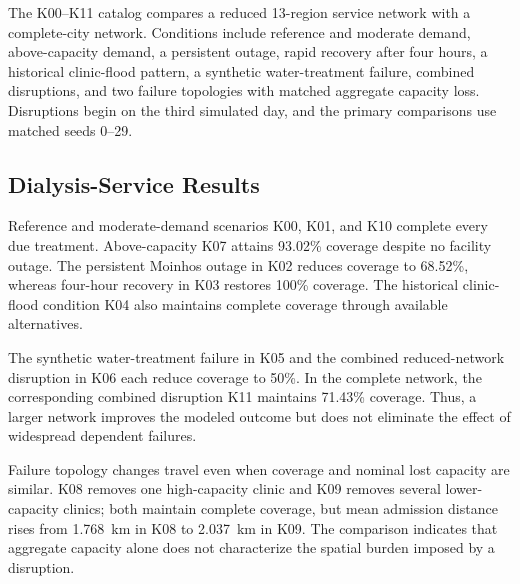 \documentclass[pdflatex,sn-mathphys-num]{sn-jnl}%
\theoremstyle{thmstyleone}%
\theoremstyle{thmstyletwo}%
\theoremstyle{thmstylethree}%
\begin{document}
The K00--K11 catalog compares a reduced 13-region service network with a complete-city network. Conditions include reference and moderate demand, above-capacity demand, a persistent outage, rapid recovery after four hours, a historical clinic-flood pattern, a synthetic water-treatment failure, combined disruptions, and two failure topologies with matched aggregate capacity loss. Disruptions begin on the third simulated day, and the primary comparisons use matched seeds 0--29.

\subsection{Dialysis-Service Results}

Reference and moderate-demand scenarios K00, K01, and K10 complete every due treatment. Above-capacity K07 attains 93.02\% coverage despite no facility outage. The persistent Moinhos outage in K02 reduces coverage to 68.52\%, whereas four-hour recovery in K03 restores 100\% coverage. The historical clinic-flood condition K04 also maintains complete coverage through available alternatives.

The synthetic water-treatment failure in K05 and the combined reduced-network disruption in K06 each reduce coverage to 50\%. In the complete network, the corresponding combined disruption K11 maintains 71.43\% coverage. Thus, a larger network improves the modeled outcome but does not eliminate the effect of widespread dependent failures.

Failure topology changes travel even when coverage and nominal lost capacity are similar. K08 removes one high-capacity clinic and K09 removes several lower-capacity clinics; both maintain complete coverage, but mean admission distance rises from 1.768~km in K08 to 2.037~km in K09. The comparison indicates that aggregate capacity alone does not characterize the spatial burden imposed by a disruption.
\end{document}
